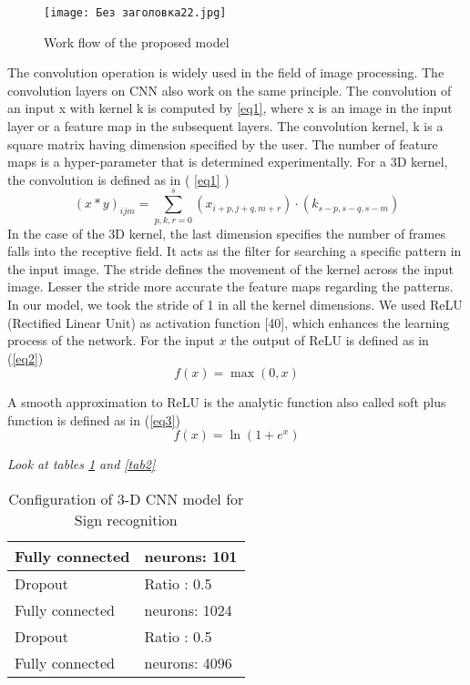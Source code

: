 \documentclass[
  manuscript=article,  %
  layout=preprint,  %
  year=20xx,
  volume=x,
]{joas}
\begin{document}
\begin{figure}[h!]
    \centering
    \texttt{[image: Без заголовка22.jpg]}
    \caption{Work flow of the proposed model}
    \label{f2}
\end{figure}



The convolution operation is widely used in the field of image processing. The convolution layers on CNN also work on the same principle. The convolution of an input x with kernel k is computed by \ref{eq1}, where x is an image in the input layer or a feature map in the subsequent layers. The convolution kernel, k is a square matrix having dimension specified by the user. The number of feature maps is a hyper-parameter that is determined experimentally. For a 3D kernel, the convolution is defined as in ( \ref{eq1} )
\begin{equation}
(x*y)_{ijm}=\sum^s_{p,k,r=0} (x_{i+p,j+q,m+r})\cdot (k_{s-p, s-q, s-m}) \label{eq1}
\end{equation}
In the case of the 3D kernel, the last dimension specifies the number of frames falls into the receptive field. It acts as the filter for searching a specific pattern in the input image. The stride defines the movement of the kernel across the input image. Lesser the stride more accurate the feature maps regarding the patterns. In our model, we took the stride of 1 in all the kernel dimensions. We used ReLU (Rectified Linear Unit) as activation function [40], which enhances the learning process of the network. For the input $x$ the output of ReLU is defined as in (\ref{eq2})
\begin{equation}
f(x)=\max(0,x) \label{eq2}
\end{equation}

A smooth approximation to ReLU is the analytic function also called soft plus function is defined as in (\ref{eq3})
\begin{equation}
f (x) = \ln(1 + e^x) \label{eq3}
\end{equation}






\par {\Huge \emph {Look at tables \ref{tab1} and \ref{tab2}}}


\begin{table}[!ht]
    \centering
    \caption{ Configuration of 3-D CNN model for Sign recognition\label{tab1}}
    \begin{tabular}{|p{6.5cm}|p{6.5cm}|}
    \hline
        Fully connected & neurons: 101\\ \hline
        Dropout & Ratio : 0.5 \\ 
        Fully connected & neurons: 1024 \\ 
        Dropout & Ratio : 0.5 \\ 
        Fully connected & neurons: 4096 \\ 
    \hline
    \end{tabular}
\end{table}
\end{document}
